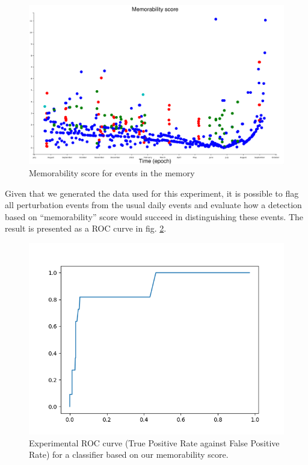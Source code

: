 \documentclass[conference]{IEEEtran}
\begin{document}
\begin{figure}[ht]
  \centering
  \includegraphics[width=\linewidth]{figures/complexities_surprises}
  \caption{Memorability score for events in the memory}
  \label{fig:result1}
\end{figure}

Given that we generated the data used for this experiment, it is possible to
flag all perturbation events from the usual daily events and evaluate how a
detection based on ``memorability'' score would succeed in distinguishing these
events. The result is presented as a ROC curve in fig. \ref{fig:roc}.

\begin{figure}[ht]
  \centering
  \includegraphics[width=\linewidth]{./figures/roc}
  \caption{Experimental ROC curve (True Positive Rate against False Positive Rate) for a
    classifier based on our memorability score.}
  \label{fig:roc}
\end{figure}
\end{document}
